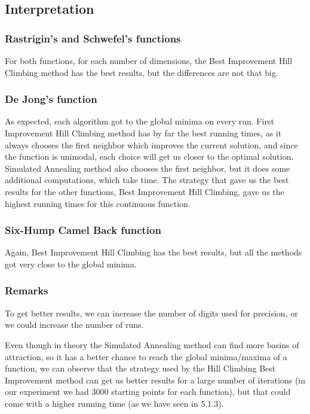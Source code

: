 \documentclass[a4paper]{article}
\begin{document}
\subsection{Interpretation}

\subsubsection{Rastrigin's and Schwefel's functions}

For both functions, for each number of dimensions, the Best Improvement Hill Climbing method has the best results, but the differences are not that big.

\subsubsection{De Jong's function}

As expected, each algorithm got to the global minima on every run. First Improvement Hill Climbing method has by far the best running times, as it always chooses the first neighbor which improves the current solution, and since the function is unimodal, each choice will get us closer to the optimal solution. Simulated Annealing method also chooses the first neighbor, but it does some additional computations, which take time. The strategy that gave us the best results for the other functions, Best Improvement Hill Climbing, gave us the highest running times for this continuous function.

\subsubsection{Six-Hump Camel Back function}

Again, Best Improvement Hill Climbing has the best results, but all the methods got very close to the global minima.

\subsubsection{Remarks}

To get better results, we can increase the number of digits used for precision, or we could increase the number of runs.

Even though in theory the Simulated Annealing method can find more basins of attraction, so it has a better chance to reach the global minima/maxima of a function, we can observe that the strategy used by the Hill Climbing Best Improvement method can get us better results for a large number of iterations (in our experiment we had 3000 starting points for each function), but that could come with a higher running time (as we have seen in 5.1.3).
\end{document}
